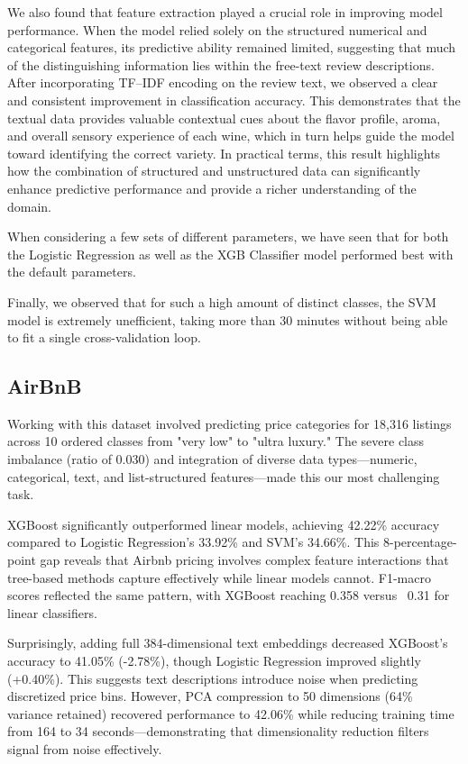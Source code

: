 \documentclass[12pt,a4paper]{article}
\begin{document}
We also found that feature extraction played a crucial role in improving model performance. When the model relied solely on the structured numerical and categorical features, its predictive ability remained limited, suggesting that much of the distinguishing information lies within the free-text review descriptions. After incorporating TF–IDF encoding on the review text, we observed a clear and consistent improvement in classification accuracy. This demonstrates that the textual data provides valuable contextual cues about the flavor profile, aroma, and overall sensory experience of each wine, which in turn helps guide the model toward identifying the correct variety. In practical terms, this result highlights how the combination of structured and unstructured data can significantly enhance predictive performance and provide a richer understanding of the domain.

When considering a few sets of different parameters, we have seen that for both the Logistic Regression as well as the XGB Classifier model performed best with the default parameters.

Finally, we observed that for such a high amount of distinct classes, the SVM model is extremely unefficient, taking more than 30 minutes without being able to fit a single cross-validation loop.

\vspace{0.5cm}

\subsection{AirBnB}
Working with this dataset involved predicting price categories for 18,316 listings across 10 ordered classes from "very low" to "ultra luxury." The severe class imbalance (ratio of 0.030) and integration of diverse data types—numeric, categorical, text, and list-structured features—made this our most challenging task.

XGBoost significantly outperformed linear models, achieving 42.22\% accuracy compared to Logistic Regression's 33.92\% and SVM's 34.66\%. This 8-percentage-point gap reveals that Airbnb pricing involves complex feature interactions that tree-based methods capture effectively while linear models cannot. F1-macro scores reflected the same pattern, with XGBoost reaching 0.358 versus ~0.31 for linear classifiers.

Surprisingly, adding full 384-dimensional text embeddings decreased XGBoost's accuracy to 41.05\% (-2.78\%), though Logistic Regression improved slightly (+0.40\%). This suggests text descriptions introduce noise when predicting discretized price bins. However, PCA compression to 50 dimensions (64\% variance retained) recovered performance to 42.06\% while reducing training time from 164 to 34 seconds—demonstrating that dimensionality reduction filters signal from noise effectively.
\end{document}

